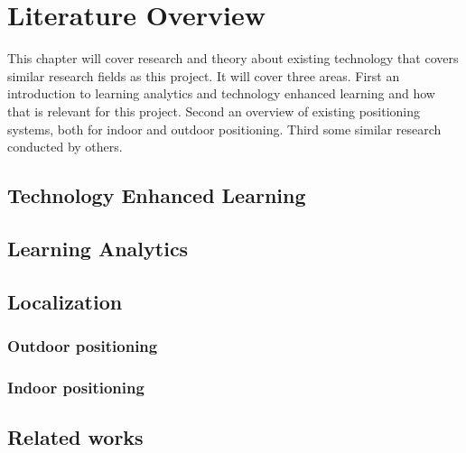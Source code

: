 \documentclass[../Main/thesis.tex]{subfiles}
\begin{document}
\chapter{Literature Overview}
\label{ch:literature_overview}
This chapter will cover research and theory about existing technology that covers similar research fields as this project. 
It will cover three areas.
First an introduction to learning analytics and technology enhanced learning and how that is relevant for this project.
Second an overview of existing positioning systems, both for indoor and outdoor positioning.
Third some similar research conducted by others.

\section{Technology Enhanced Learning}


\section{Learning Analytics} 


\section{Localization}

\subsection{Outdoor positioning}

\subsection{Indoor positioning}

\section{Related works}

\blankpage
\end{document}
